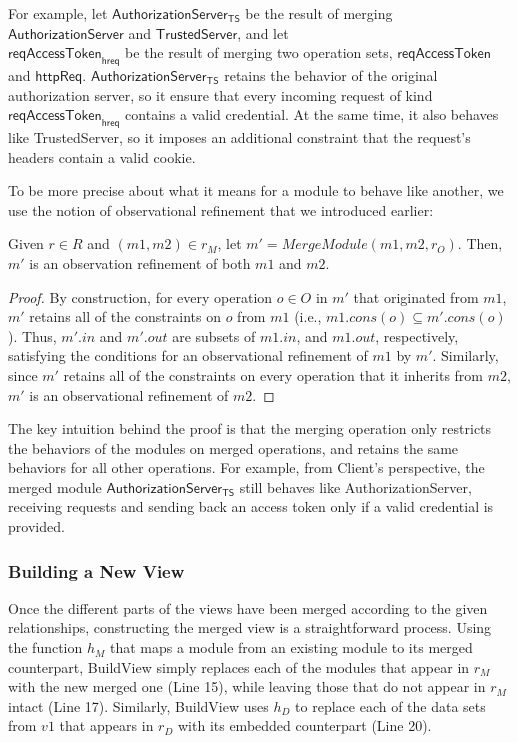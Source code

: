 For example, let $\textsf{AuthorizationServer}_\textsf{TS}$ be the
result of merging $\textsf{AuthorizationServer}$ and
$\textsf{TrustedServer}$, and let
\\$\textsf{reqAccessToken}_\textsf{hreq}$ be the result of merging two
operation sets, $\textsf{reqAccessToken}$ and
$\textsf{httpReq}$. $\textsf{AuthorizationServer}_\textsf{TS}$ retains
the behavior of the original authorization server, so it ensure that
every incoming request of kind $\textsf{reqAccessToken}_\textsf{hreq}$
contains a valid credential. At the same time, it also behaves like
\textsf{TrustedServer}, so it imposes an additional constraint that
the request's headers contain a valid cookie.

To be more precise about what it means for a module to behave like
another, we use the notion of observational refinement that we
introduced earlier:
\begin{thm}
\label{thm-refinement}
Given $r \in R$ and $(m1, m2) \in r_{M}$, let $m' = MergeModule(m1,
m2, r_{O})$. Then, $m'$
is an observation refinement of both $m1$ and $m2$.
\end{thm}
\begin{proof}
  By construction, for every operation $o \in O$ in $m'$ that
  originated from $m1$, $m'$ retains all of the constraints on $o$
  from $m1$ (i.e., $m1.cons(o) \subseteq m'.cons(o)$). Thus, $m'.in$
  and $m'.out$ are subsets of $m1.in$, and $m1.out$, respectively,
  satisfying the conditions for an observational refinement of $m1$ by
  $m'$.  Similarly, since $m'$ retains all of the constraints on every
  operation that it inherits from $m2$, $m'$ is an observational
  refinement of $m2$.
\end{proof}
The key intuition behind the proof is that the merging operation only
restricts the behaviors of the modules on merged operations, and
retains the same behaviors for all other operations. For example, from
\textsf{Client}'s perspective, the merged module
$\textsf{AuthorizationServer}_\textsf{TS}$ still behaves like
\textsf{AuthorizationServer}, receiving
requests and sending back an access token only if a valid credential
is provided.

\subsubsection{Building a New View}

Once the different parts of the views have been merged according to
the given relationships, constructing the merged view is a
straightforward process. Using the function $h_{M}$ that maps a module
from an existing module to its merged counterpart, \textsf{BuildView}
simply replaces each of the modules that appear in $r_{M}$ with the
new merged one (Line 15), while leaving those that do not appear in
$r_{M}$ intact (Line 17). Similarly, \textsf{BuildView} uses $h_{D}$
to replace each of the data sets from $v1$ that appears in $r_{D}$
with its embedded counterpart (Line 20).  

